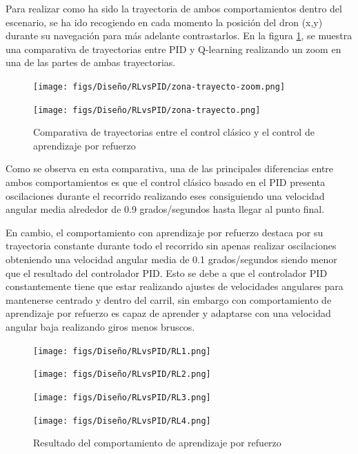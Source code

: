 Para realizar como ha sido la trayectoria de ambos comportamientos dentro del escenario, se ha ido recogiendo en cada momento la posición del dron (x,y) durante su navegación
 para más adelante contrastarlos. En la figura \ref{fig:Comparativa-de-trayectorias}, se muestra una comparativa de trayectorias entre PID y Q-learning 
realizando un zoom en una de las partes de ambas 
trayectorias.

\begin{figure}[H]
  \centering
  \begin{minipage}{0.55\textwidth}
    \texttt{[image: figs/Diseño/RLvsPID/zona-trayecto-zoom.png]}
  \end{minipage}

  \vspace{1cm}

  \begin{minipage}{0.55\textwidth}
    \texttt{[image: figs/Diseño/RLvsPID/zona-trayecto.png]}
  \end{minipage}
  \caption{Comparativa de trayectorias entre el control clásico y el control de aprendizaje por refuerzo}
  \label{fig:Comparativa-de-trayectorias}
\end{figure}

Como se observa en esta comparativa, una de las principales diferencias entre ambos comportamientos es que el control clásico basado en el PID presenta oscilaciones durante el recorrido 
realizando eses consiguiendo una velocidad angular media alrededor de 0.9 grados/segundos hasta llegar al punto final.  

En cambio, el comportamiento con aprendizaje por refuerzo destaca por su trayectoria constante durante todo el recorrido sin apenas realizar oscilaciones obteniendo una velocidad angular 
media de 0.1 grados/segundos siendo menor que el resultado del controlador PID. Esto se debe a que el controlador PID constantemente tiene que estar realizando ajustes de velocidades 
angulares para mantenerse centrado y dentro del carril, sin embargo con comportamiento de aprendizaje por refuerzo es capaz de aprender y adaptarse con una velocidad angular baja 
realizando giros menos bruscos. 

\begin{figure}[H]
  \centering
  \begin{minipage}{0.3\textwidth}
    \texttt{[image: figs/Diseño/RLvsPID/RL1.png]}
  \end{minipage}
  \hfill
  \begin{minipage}{0.3\textwidth}
    \texttt{[image: figs/Diseño/RLvsPID/RL2.png]}
  \end{minipage}
  \hfill
  \begin{minipage}{0.3\textwidth}
    \texttt{[image: figs/Diseño/RLvsPID/RL3.png]}
  \end{minipage}
  \hfill
  \begin{minipage}{0.3\textwidth}
    \texttt{[image: figs/Diseño/RLvsPID/RL4.png]}
  \end{minipage}
  \caption{Resultado del comportamiento de aprendizaje por refuerzo}
  \label{fig:Resultado-imagenes}
\end{figure}

